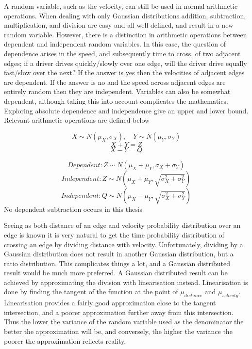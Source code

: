 \documentclass{article}
\begin{document}
			A random variable, such as the velocity, can still be used in normal arithmetic operations. When dealing with only Gaussian distributions addition, subtraction, multiplication, and division are easy and all well defined, and result in a new random variable. However, there is a distinction in arithmetic operations between dependent and independent random variables. In this case, the question of dependence arises in the speed, and subsequently time to cross, of two adjacent edges; if a driver drives quickly/slowly over one edge, will the driver drive equally fast/slow over the next? If the answer is yes then the velocities of adjacent edges are dependent. If the answer is no and the speed across adjacent edges are entirely random then they are independent. Variables can also be somewhat dependent, although taking this into account complicates the mathematics. Exploring absolute dependence and independence give an upper and lower bound. Relevant arithmetic operations are defined below

			\begin{equation*}
				X \sim N(\mu_X, \sigma_X), \mspace{18mu} Y \sim N(\mu_Y, \sigma_Y)
			\end{equation*}
			\begin{equation*}
				X + Y = Z
			\end{equation*}
			\begin{equation*}
				X - Y = Q
			\end{equation*}

			\begin{equation}
				Dependent: Z \sim N(\mu_X + \mu_Y, \sigma_X + \sigma_Y)
			\end{equation}
			\begin{equation}
				Independent: Z \sim N(\mu_X + \mu_Y, \sqrt{\sigma_X^2 + \sigma_Y^2})
			\end{equation}
			\begin{equation}
				Independent: Q \sim N(\mu_X - \mu_Y, \sqrt{\sigma_X^2 + \sigma_Y^2})
			\end{equation}
			No dependent subtraction occurs in this thesis

			Seeing as both distance of an edge and velocity probability distribution over an edge is known it is very natural to get the time probability distribution of crossing an edge by dividing distance with velocity. Unfortunately, dividing by a Gaussian distribution does not result in another Gaussian distribution, but a ratio distribution. This complicates things a lot, and a Gaussian distributed result would be much more preferred. A Gaussian distributed result can be achieved by approximating the division with linearisation instead. Linearisation is done by finding the tangent of the function at the point of $\mu_{distance}$ and $\mu_{velocity}$. Linearisation provides a fairly good approximation close to the tangent intersection, and a poorer approximation further away from this intersection. Thus the lower the variance of the random variable used as the denominator the better the approximation will be, and conversely, the higher the variance the poorer the approximation reflects reality.
\end{document}
